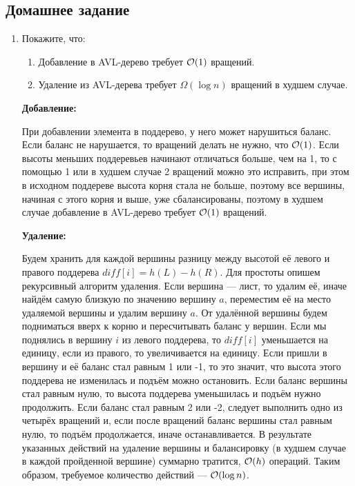 \subsection{Домашнее задание}
\begin{enumerate}
  \item
    Покажите, что:
    \begin{enumerate}
      \item Добавление в AVL-дерево требует $\mathcal{O}(1)$ вращений.
      \item Удаление из AVL-дерева требует $\Omega(\log n)$ вращений в худшем случае.
    \end{enumerate}
    \begin{solution}
      \textbf{Добавление:}
      
      При добавлении элемента в поддерево, у него может нарушиться баланс. Если баланс не нарушается, то вращений делать не нужно, что $\mathcal{O}(1)$. Если высоты меньших поддеревьев начинают отличаться больше, чем на 1, то с помощью 1 или в худшем случае 2 вращений можно это исправить, при этом в исходном поддереве высота корня стала не больше, поэтому все вершины, начиная с этого корня и выше, уже сбалансированы, поэтому в худшем случае добавление в AVL-дерево требует $\mathcal{O}(1)$ вращений.

      \textbf{Удаление:}

      Будем хранить для каждой вершины разницу между высотой её левого и правого поддерева $diff[i]=h(L)-h(R)$. Для простоты опишем рекурсивный алгоритм удаления. Если вершина — лист, то удалим её, иначе найдём самую близкую по значению вершину $a$, переместим её на место удаляемой вершины и удалим вершину $a$. От удалённой вершины будем подниматься вверх к корню и пересчитывать баланс у вершин. Если мы поднялись в вершину $i$ из левого поддерева, то $diff[i]$ уменьшается на единицу, если из правого, то увеличивается на единицу. Если пришли в вершину и её баланс стал равным 1 или -1, то это значит, что высота этого поддерева не изменилась и подъём можно остановить. Если баланс вершины стал равным нулю, то высота поддерева уменьшилась и подъём нужно продолжить. Если баланс стал равным 2 или -2, следует выполнить одно из четырёх вращений и, если после вращений баланс вершины стал равным нулю, то подъём продолжается, иначе останавливается. В результате указанных действий на удаление вершины и балансировку (в худшем случае в каждой пройденной вершине) суммарно тратится, $\mathcal{O}(h)$ операций. Таким образом, требуемое количество действий — $\mathcal{O}(\log n)$.
    \end{solution}
    

\end{enumerate}
